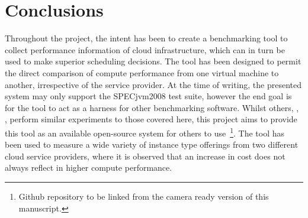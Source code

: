 \documentclass{llncs}
\begin{document}

\section{Conclusions}

Throughout the project, the intent has been to create a benchmarking tool to collect performance information of cloud infrastructure, which can in turn be used to make superior scheduling decisions. The tool has been designed to permit the direct comparison of compute performance from one virtual machine to another, irrespective of the service provider. At the time of writing, the presented system may only support the SPECjvm2008 test suite, however the end goal is for the tool to act as a harness for other benchmarking software. Whilst others, \cite{li2010cloudcmp}, \cite{chhetri2013smart}, perform similar experiments to those covered here, this project aims to provide this tool as an available open-source system for others to use~\footnote{Github repository to be linked from the camera ready version of this manuscript.}. The tool has been used to measure a wide variety of instance type offerings from two different cloud service providers, where it is observed that an increase in cost does not always reflect in higher compute performance.

%
%


\end{document}
